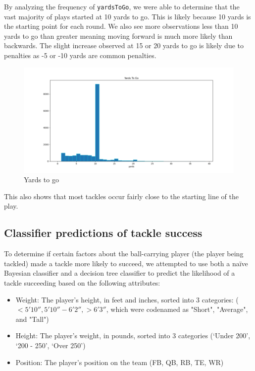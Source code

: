 \documentclass[bibtex, sigconf, hyperref={colorlinks=true,linkcolor=blue,urlcolor=blue}]{acmart}
\begin{document}
By analyzing the frequency of \verb|yardsToGo|, we were able to determine that
the vast majority of plays started at 10 yards to go. This is likely because
10 yards is the starting point for each round. We also see more observations
less than 10 yards to go than greater meaning moving forward is much more likely
than backwards. The slight increase observed at 15 or 20 yards to go is likely
due to penalties as -5 or -10 yards are common penalties.

\begin{figure}[h]
  \centering
  \includegraphics[width=\linewidth]{../src/yards.png}
  \caption{Yards to go}
\end{figure}

This also shows that most tackles occur fairly close to the starting line of the play.

\subsection{Classifier predictions of tackle success}

To determine if certain factors about the ball-carrying player (the player being tackled)
made a tackle more likely to succeed, we attempted to use both a na\"ive Bayesian
classifier and a decision tree classifier to predict the likelihood of a tackle succeeding
based on the following attributes:

\begin{itemize}
\item Weight: The player's height, in feet and inches, sorted into 3 categories: ($< 5'10'',
5'10''-6'2'', > 6'3''$, which were codenamed as "Short", "Average", and "Tall")
\item Height: The player's weight, in pounds, sorted into 3 categories (`Under 200', `200 -
250', `Over 250')
\item Position: The player's position on the team (FB, QB, RB, TE, WR)
\end{itemize}
\end{document}
